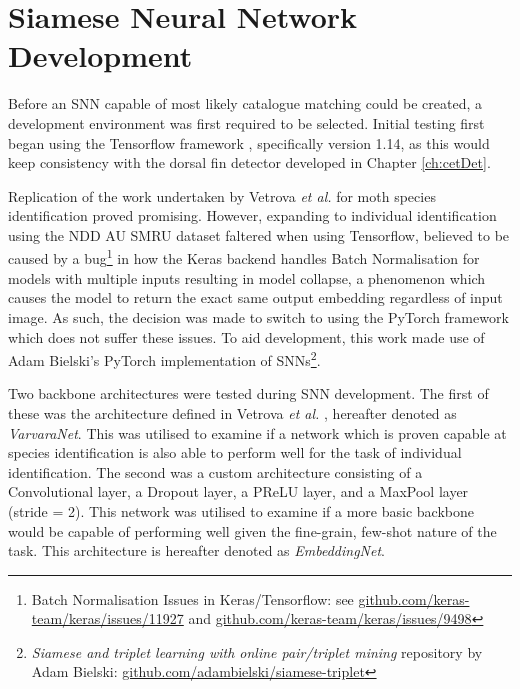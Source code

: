 \section{Siamese Neural Network Development}\label{ch:ID,sec:SNNDevelopment}

Before an SNN capable of most likely catalogue matching could be created, a development environment was first required to be selected. Initial testing first began using the Tensorflow framework \cite{abadi_tensorflow:_2016}, specifically version 1.14, as this would keep consistency with the dorsal fin detector developed in Chapter \ref{ch:cetDet}. 

Replication of the work undertaken by Vetrova \textit{et al.} \cite{vetrova_hidden_2018} for moth species identification proved promising. However, expanding to individual identification using the NDD AU SMRU dataset faltered when using Tensorflow, believed to be caused by a bug\footnote{Batch Normalisation Issues in Keras/Tensorflow: see \href{https://github.com/keras-team/keras/issues/11927}{github.com/keras-team/keras/issues/11927} and  \href{https://github.com/keras-team/keras/issues/9498}{github.com/keras-team/keras/issues/9498}} in how the Keras backend handles Batch Normalisation for models with multiple inputs resulting in model collapse, a phenomenon which causes the model to return the exact same output embedding regardless of input image. As such, the decision was made to switch to using the PyTorch framework \cite{paszke_automatic_2017} which does not suffer these issues. To aid development, this work made use of Adam Bielski's PyTorch implementation of SNNs\footnote{\textit{Siamese and triplet learning with online pair/triplet mining} repository by Adam Bielski: \href{https://github.com/adambielski/siamese-triplet}{github.com/adambielski/siamese-triplet}}.

Two backbone architectures were tested during SNN development. The first of these was the architecture defined in Vetrova \textit{et al.} \cite{vetrova_hidden_2018}, hereafter denoted as \textit{VarvaraNet}. This was utilised to examine if a network which is proven capable at species identification is also able to perform well for the task of individual identification. The second was a custom architecture consisting of a Convolutional layer, a Dropout layer, a PReLU layer, and a MaxPool layer (stride = 2). This network was utilised to examine if a more basic backbone would be capable of performing well given the fine-grain, few-shot nature of the task. This architecture is hereafter denoted as \textit{EmbeddingNet}.

